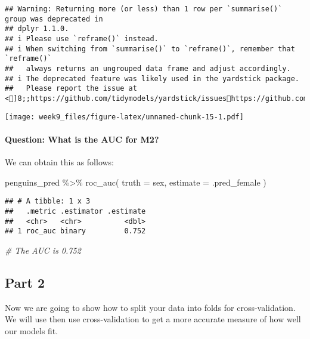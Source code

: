 \documentclass[
]{article}
\newenvironment{Shaded}{\begin{snugshade}}{\end{snugshade}}
\newcommand{\AttributeTok}[1]{\textcolor[rgb]{0.77,0.63,0.00}{#1}}
\newcommand{\CommentTok}[1]{\textcolor[rgb]{0.56,0.35,0.01}{\textit{#1}}}
\newcommand{\FunctionTok}[1]{\textcolor[rgb]{0.00,0.00,0.00}{#1}}
\newcommand{\NormalTok}[1]{#1}
\newcommand{\SpecialCharTok}[1]{\textcolor[rgb]{0.00,0.00,0.00}{#1}}
\begin{document}
\begin{verbatim}
## Warning: Returning more (or less) than 1 row per `summarise()` group was deprecated in
## dplyr 1.1.0.
## i Please use `reframe()` instead.
## i When switching from `summarise()` to `reframe()`, remember that `reframe()`
##   always returns an ungrouped data frame and adjust accordingly.
## i The deprecated feature was likely used in the yardstick package.
##   Please report the issue at <]8;;https://github.com/tidymodels/yardstick/issueshttps://github.com/tidymodels/yardstick/issues]8;;>.
\end{verbatim}

\texttt{[image: week9\_files/figure-latex/unnamed-chunk-15-1.pdf]}

\hypertarget{question-what-is-the-auc-for-m2}{%
\paragraph{Question: What is the AUC for
M2?}\label{question-what-is-the-auc-for-m2}}

We can obtain this as follows:

\begin{Shaded}
\begin{Highlighting}[]
\NormalTok{penguins\_pred }\SpecialCharTok{\%\textgreater{}\%} \FunctionTok{roc\_auc}\NormalTok{( }\AttributeTok{truth =}\NormalTok{ sex, }\AttributeTok{estimate =}\NormalTok{ .pred\_female )}
\end{Highlighting}
\end{Shaded}

\begin{verbatim}
## # A tibble: 1 x 3
##   .metric .estimator .estimate
##   <chr>   <chr>          <dbl>
## 1 roc_auc binary         0.752
\end{verbatim}

\begin{Shaded}
\begin{Highlighting}[]
\CommentTok{\# The AUC is 0.752}
\end{Highlighting}
\end{Shaded}

\hypertarget{part-2}{%
\subsection{Part 2}\label{part-2}}

Now we are going to show how to split your data into folds for
cross-validation. We will use then use cross-validation to get a more
accurate measure of how well our models fit.
\end{document}
